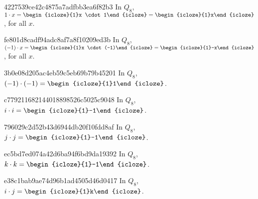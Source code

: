\begin{note}{4227539ce42c4875a7adfbb3ea6f82b3}
    In \({ Q_8 }\), \quad
    \({ 1 \cdot x = \begin{icloze}{1}x \cdot 1\end{icloze} = \begin{icloze}{1}x\end{icloze} }\), \quad for all \({ x }\).
\end{note}

\begin{note}{fe801d8cadf94adc8af7a8f10209ed3b}
    In \({ Q_8 }\), \quad
    \({ (-1) \cdot x = \begin{icloze}{1}x \cdot (-1)\end{icloze} = \begin{icloze}{1}-x\end{icloze} }\), \quad for all \({ x }\).
\end{note}

\begin{note}{3b0e08d205ac4eb59c5eb69b79b45201}
    In \({ Q_8 }\), \quad
    \({ (-1) \cdot (-1) = \begin{icloze}{1}1\end{icloze} }\).
\end{note}

\begin{note}{c779211682144018898526c5025c9048}
    In \({ Q_8 }\), \quad
    \({ i \cdot i = \begin{icloze}{1}-1\end{icloze} }\).
\end{note}

\begin{note}{796029c2d52b43d6944db20f10fdd8af}
    In \({ Q_8 }\), \quad
    \({ j \cdot j = \begin{icloze}{1}-1\end{icloze} }\).
\end{note}

\begin{note}{ec5bd7ed074a42d6ba94f6bd9da19392}
    In \({ Q_8 }\), \quad
    \({ k \cdot k = \begin{icloze}{1}-1\end{icloze} }\).
\end{note}

\begin{note}{e38c1bab9ae74d96b1ad4505d46d0417}
    In \({ Q_8 }\), \quad
    \({ i \cdot j = \begin{icloze}{1}k\end{icloze} }\).
\end{note}

